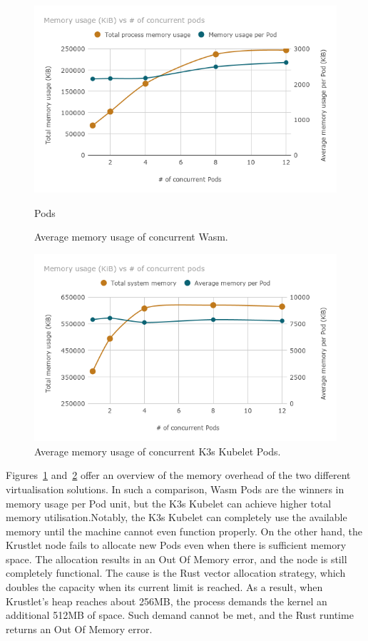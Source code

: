 \begin{figure}[ht]
\centering
\includegraphics[width=\columnwidth]{figures/b-krustlet-2}
\caption{Average memory usage of concurrent Wasm.}
Pods \label{fig:b-krustlet-2}
\end{figure}

\begin{figure}[ht]
\centering
\includegraphics[width=\columnwidth]{figures/b-krustlet-3}
\caption{Average memory usage of concurrent K3s Kubelet Pods.}
\label{fig:b-krustlet-3}
\end{figure}

Figures~\ref{fig:b-krustlet-2} and~\ref{fig:b-krustlet-3} offer an overview of the memory overhead of the two different virtualisation solutions. In such a comparison, Wasm Pods are the winners in memory usage per Pod unit, but the K3s Kubelet can achieve higher total memory utilisation.Notably, the K3s Kubelet can completely use the available memory until the machine cannot even function properly. On the other hand, the Krustlet node fails to allocate new Pods even when there is sufficient memory space. The allocation results in an Out Of Memory error, and the node is still completely functional. The cause is the Rust vector allocation strategy, which doubles the capacity when its current limit is reached. As a result, when Krustlet's heap reaches about 256MB, the process demands the kernel an additional 512MB of space. Such demand cannot be met, and the Rust runtime returns an Out Of Memory error.

